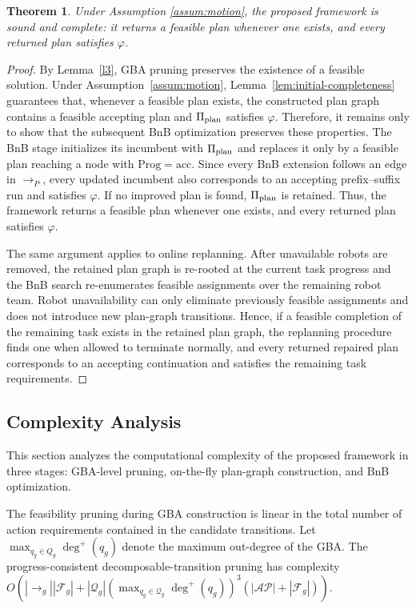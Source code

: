 \documentclass[lettersize,journal]{IEEEtran}
\theoremstyle{italiclemma}
\theoremstyle{italiclemma}
\newtheorem{theorem}{Theorem}
\theoremstyle{definition}
\begin{document}
\begin{theorem} \label{thm:soundness_completeness}
Under Assumption \ref{assum:motion}, the proposed framework is sound and complete: it returns a feasible plan whenever one exists, and every returned plan satisfies $\varphi$.
\end{theorem}
\begin{proof}
By Lemma~\ref{l3}, GBA pruning preserves the existence of a feasible solution. Under Assumption~\ref{assum:motion},
Lemma~\ref{lem:initial-completeness} guarantees that, whenever a feasible plan exists, the constructed plan graph contains a feasible accepting plan and $\Pi_{\rm plan}$ satisfies $\varphi$.  Therefore, it remains only to show that the subsequent BnB optimization preserves these properties.
The BnB stage initializes its incumbent with $\Pi_{\rm plan}$ and replaces it only by a feasible plan reaching a node with $\mathrm{Prog}=\mathrm{acc}$. Since every BnB extension follows an edge in $\rightarrow_P$, every updated incumbent also corresponds to an accepting prefix--suffix run and satisfies $\varphi$. If no improved plan is found, $\Pi_{\rm plan}$ is retained. Thus, the framework returns a feasible plan whenever one exists, and every returned plan satisfies $\varphi$.

The same argument applies to online replanning. After unavailable robots are removed, the retained plan graph is re-rooted at the current task progress and the BnB search re-enumerates feasible assignments over the remaining robot team. Robot unavailability can only eliminate
previously feasible assignments and does not introduce new plan-graph transitions. Hence, if a feasible completion of the remaining task exists in the retained plan graph, the replanning procedure finds one when allowed to terminate normally, and every returned repaired plan corresponds to an accepting continuation and satisfies the remaining
task requirements.
\end{proof}

\subsection{Complexity Analysis}
\label{sec:complexity}

This section analyzes the computational complexity of the proposed framework in three stages: GBA-level pruning, on-the-fly plan-graph construction, and BnB optimization.

The feasibility pruning during GBA construction is linear in the total number of action requirements contained in the candidate transitions. Let $\max_{q_g\in Q_g}\deg^+(q_g)$ denote the maximum out-degree of the GBA. The progress-consistent decomposable-transition pruning has complexity $O(|\rightarrow_g||\mathcal F_g|+|\mathcal Q_g|(\max_{q_g\in \mathcal  Q_g}\deg^+(q_g))^3(|\mathcal{AP}|+|\mathcal F_g|))$.
\end{document}

